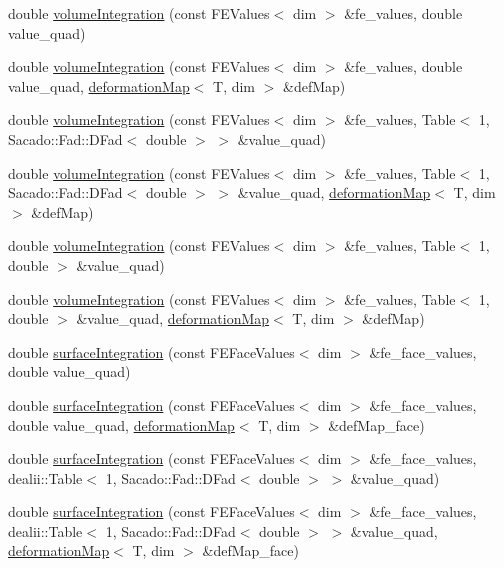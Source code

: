 \begin{DoxyCompactItemize}
\item 
double \hyperlink{class_residual_a8ac0b75533aa9e599cc3c623e57fa5aa}{volume\-Integration} (const F\-E\-Values$<$ dim $>$ \&fe\-\_\-values, double value\-\_\-quad)
\item 
double \hyperlink{class_residual_ad535764375d2690424b1545898b8a168}{volume\-Integration} (const F\-E\-Values$<$ dim $>$ \&fe\-\_\-values, double value\-\_\-quad, \hyperlink{structdeformation_map}{deformation\-Map}$<$ T, dim $>$ \&def\-Map)
\item 
double \hyperlink{class_residual_ab9fdc6a8b102af5beaa1e4eb6fb7fa40}{volume\-Integration} (const F\-E\-Values$<$ dim $>$ \&fe\-\_\-values, Table$<$ 1, Sacado\-::\-Fad\-::\-D\-Fad$<$ double $>$ $>$ \&value\-\_\-quad)
\item 
double \hyperlink{class_residual_a50acc2c1f154889f83606a2b2e2d555c}{volume\-Integration} (const F\-E\-Values$<$ dim $>$ \&fe\-\_\-values, Table$<$ 1, Sacado\-::\-Fad\-::\-D\-Fad$<$ double $>$ $>$ \&value\-\_\-quad, \hyperlink{structdeformation_map}{deformation\-Map}$<$ T, dim $>$ \&def\-Map)
\item 
double \hyperlink{class_residual_a734c1bb6a4a56aa1c774485441e47340}{volume\-Integration} (const F\-E\-Values$<$ dim $>$ \&fe\-\_\-values, Table$<$ 1, double $>$ \&value\-\_\-quad)
\item 
double \hyperlink{class_residual_ae097f5d9f2a92108cb0a1c7ecf4510c3}{volume\-Integration} (const F\-E\-Values$<$ dim $>$ \&fe\-\_\-values, Table$<$ 1, double $>$ \&value\-\_\-quad, \hyperlink{structdeformation_map}{deformation\-Map}$<$ T, dim $>$ \&def\-Map)
\item 
double \hyperlink{class_residual_ac48cd0a04f0d2f91a23e60135652d938}{surface\-Integration} (const F\-E\-Face\-Values$<$ dim $>$ \&fe\-\_\-face\-\_\-values, double value\-\_\-quad)
\item 
double \hyperlink{class_residual_ad44c10c32c915ba9b431c0256a2769c2}{surface\-Integration} (const F\-E\-Face\-Values$<$ dim $>$ \&fe\-\_\-face\-\_\-values, double value\-\_\-quad, \hyperlink{structdeformation_map}{deformation\-Map}$<$ T, dim $>$ \&def\-Map\-\_\-face)
\item 
double \hyperlink{class_residual_a6753ecdc0e19b7bac24615d47889ae65}{surface\-Integration} (const F\-E\-Face\-Values$<$ dim $>$ \&fe\-\_\-face\-\_\-values, dealii\-::\-Table$<$ 1, Sacado\-::\-Fad\-::\-D\-Fad$<$ double $>$ $>$ \&value\-\_\-quad)
\item 
double \hyperlink{class_residual_a71923ccf434fa6503c37afd0ca7d0100}{surface\-Integration} (const F\-E\-Face\-Values$<$ dim $>$ \&fe\-\_\-face\-\_\-values, dealii\-::\-Table$<$ 1, Sacado\-::\-Fad\-::\-D\-Fad$<$ double $>$ $>$ \&value\-\_\-quad, \hyperlink{structdeformation_map}{deformation\-Map}$<$ T, dim $>$ \&def\-Map\-\_\-face)

\end{DoxyCompactItemize}
